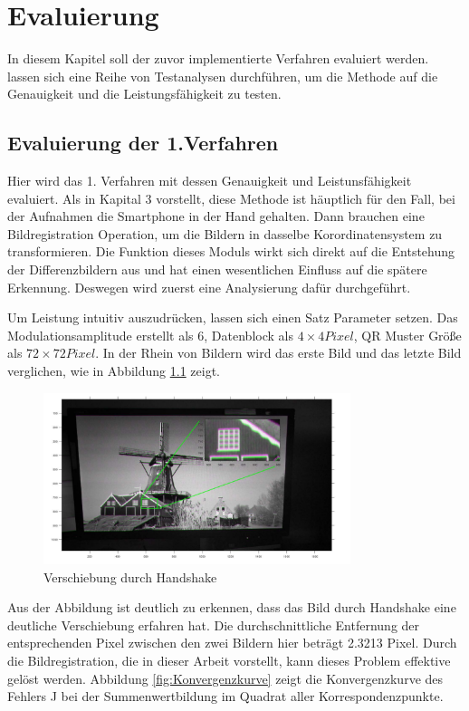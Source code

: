 \chapter{Evaluierung} \label{cha:Evaluierung}

In diesem Kapitel soll der zuvor implementierte Verfahren evaluiert werden.  lassen sich eine Reihe von Testanalysen durchführen, um die Methode auf die Genauigkeit und die Leistungsfähigkeit zu testen.


\section{Evaluierung der 1.Verfahren}

Hier wird das 1. Verfahren mit dessen Genauigkeit und Leistunsfähigkeit evaluiert. Als in Kapital 3 vorstellt, diese Methode ist häuptlich für den Fall, bei der Aufnahmen die Smartphone in der Hand gehalten. Dann brauchen eine Bildregistration Operation, um die Bildern in dasselbe Korordinatensystem zu transformieren. Die Funktion dieses Moduls wirkt sich direkt auf die Entstehung der Differenzbildern aus und hat einen wesentlichen Einfluss auf die spätere Erkennung. Deswegen wird zuerst eine Analysierung dafür durchgeführt.

Um Leistung intuitiv auszudrücken, lassen sich einen Satz Parameter setzen. Das Modulationsamplitude erstellt als 6, Datenblock als $ 4 \times 4 Pixel$, QR Muster Größe als $ 72 \times 72 Pixel $.  In der Rhein von Bildern wird das erste Bild und das letzte Bild verglichen, wie in Abbildung \ref{fig:vorregistration} zeigt. 
\begin{figure}[H]
 \centering 
  \includegraphics[keepaspectratio,width=0.8\textwidth]{images/5_Implementirung/vorregistration.pdf}
 \caption{Verschiebung durch Handshake}
 \label{fig:vorregistration}
\end{figure}

Aus der Abbildung ist deutlich zu erkennen, dass das Bild durch Handshake eine deutliche Verschiebung erfahren hat. Die durchschnittliche Entfernung der entsprechenden Pixel zwischen den zwei Bildern hier beträgt 2.3213 Pixel. Durch die Bildregistration, die in dieser Arbeit vorstellt, kann dieses Problem effektive gelöst werden. Abbildung \ref{fig:Konvergenzkurve} zeigt die Konvergenzkurve des Fehlers J bei der Summenwertbildung im Quadrat aller Korrespondenzpunkte.

